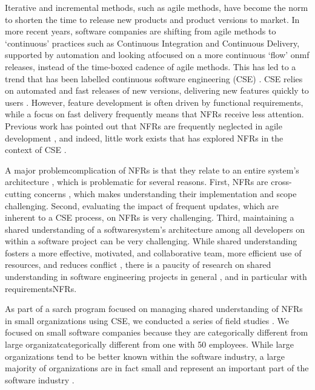 \documentclass[smallextended]{svjour3}
\begin{document}
Iterative and incremental methods, such as agile methods, have become the norm to shorten the time to release new products and product versions to market. In more recent years, software companies are shifting from agile methods to `continuous' practices such as Continuous Integration and Continuous Delivery, supported by automation and looking atfocused on a more continuous `flow' onmf releases, instead of the time-boxed cadence of agile methods. This has led to a trend that has been labelled continuous software engineering (CSE) \citep{fitzgerald2017continuous,bosch2014continuous,klotins2023continuous}.
CSE relies on automated and fast releases of new versions, delivering new features quickly to users \citep{gralha_evolution_2018,klotins2023continuous}. 
However, feature development is often driven by functional requirements, while a focus on fast delivery frequently means that NFRs receive less attention. Previous work has pointed out that NFRs are frequently neglected in agile development \citep{ramesh_agile_2010}, and indeed, little work exists that has explored NFRs in the context of CSE \citep{behutiye_non-functional_2017}.


A major problemcomplication of NFRs is that they relate to an entire system's architecture \citep{bass2012software}, which is problematic for several reasons. First, NFRs are cross-cutting concerns \citep{bellomo_evolutionary_2014}, which makes understanding their implementation and scope challenging. Second, evaluating the impact of frequent updates, which are inherent to a CSE process, on NFRs is very challenging. 
Third, maintaining a shared understanding of a softwaresystem's architecture among all developers on within a software project can be very challenging. 
While shared understanding fosters a more effective, motivated, and collaborative team, more efficient use of resources, and reduces conflict \citep{darch_shared_2009}, there is a paucity of research on shared understanding in software engineering projects in general \citep{glinz_shared_2015}, and in particular with requirementsNFRs. 

As part of a sarch program focused on managing shared understanding of NFRs in small organizations using CSE, we conducted a series of field studies \citep{werner2020re,werner_tse_2021,okpara_re2022,okpara_rej2023}. 
We focused on small software companies because they are categorically different from large organizatcategorically different from one with 50 employees. While large organizations tend to be better known within the software industry, a large majority of organizations are in fact small and represent an important part of the software industry \citep{richardson2007guest,sanchez2016understanding}. 
\end{document}
